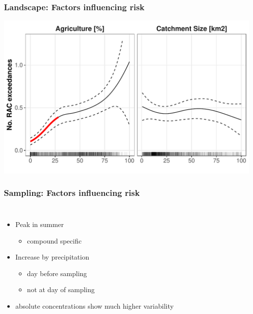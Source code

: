 \documentclass[
	10pt
	]{beamer}
\begin{document}
\begin{frame}
\frametitle{Landscape: Factors influencing risk}
	\includegraphics[width = 1\textwidth]{figs/agri_size_eff.pdf}
\end{frame}

\begin{frame}
\frametitle{Sampling: Factors influencing risk}
	\begin{columns}
			\resizebox{1.1\textwidth}{!}{%
				}
	    	\begin{itemize}
	    		\item Peak in summer
	    			\begin{itemize}
	    			    \item compound specific
	    			\end{itemize}
	    		\item Increase by \alert{precipitation}
			    	\begin{itemize}		
			    		\item day before sampling
			    		\item not at day of sampling
			    	\end{itemize}	
	    		\item absolute concentrations show much higher variability
	    	\end{itemize}
	\end{columns}
\end{frame}
\end{document}
